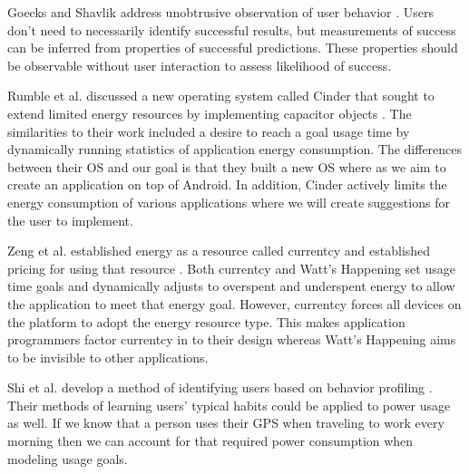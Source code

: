 Goecks and Shavlik address unobtrusive observation of user behavior \cite{Goecks:2000:LUI:325737.325806}. 
Users don't need to necessarily identify successful results, but measurements of success can be inferred from properties of successful predictions. 
These properties should be observable without user interaction to assess likelihood of success. 


Rumble et al. discussed a new operating system called Cinder that sought to extend limited energy resources by implementing capacitor objects \cite{Rumble:2009:AJT:1592606.1592618}. 
The similarities to their work included a desire to reach a goal usage time by dynamically running statistics of application energy consumption. 
The differences between their OS and our goal is that they built a new OS where as we aim to create an application on top of Android. 
In addition, Cinder actively limits the energy consumption of various applications where we will create suggestions for the user to implement. 

Zeng et al. established energy as a resource called currentcy and established pricing for using that resource \cite{Zeng:2003:CUA:1247340.1247344}. 
Both currentcy and Watt's Happening set usage time goals and dynamically adjusts to overspent and underspent energy to allow the application to meet that energy goal. 
However, currentcy forces all devices on the platform to adopt the energy resource type. 
This makes application programmers factor currentcy in to their design whereas Watt's Happening aims to be invisible to other applications. 

Shi et al. develop a method of identifying users based on behavior profiling \cite{learningUserBehavior}. 
Their methods of learning users' typical habits could be applied to power usage as well. 
If we know that a person uses their GPS when traveling to work every morning then we can account for that required power consumption when modeling usage goals. 

